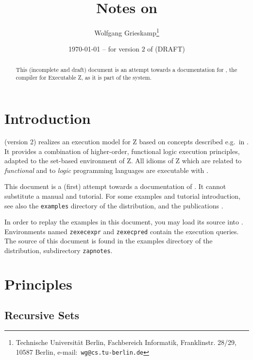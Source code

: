 \documentclass{article}
\begin{document}
\title{Notes on \ZAP}

\author{Wolfgang Grieskamp\thanks{Technische Universit\"at Berlin,
    Fachbereich Informatik, Franklinstr. 28/29, 10587 Berlin,
    e-mail:~\texttt{wg@cs.tu-berlin.de}}}

\date{\today{} -- for version $2$ of \ZAP{} (DRAFT)}

\maketitle

\begin{abstract}
  This (incomplete and draft) document is an attempt towards a
  documentation for \ZAP, the compiler for
  Executable Z, as it is part of the \Zeta{} system. 
\end{abstract}

\tableofcontents

\section{Introduction}

\ZAP{} (version 2) realizes an execution model for Z based on concepts
described e.g.~in \cite{gri99b,gri00a}. It provides a
combination of higher-order, functional logic execution principles,
adapted to the set-based environment of Z. All idioms of Z which are
related to \emph{functional} and to \emph{logic} programming languages
are executable with \ZAP.

This document is a (first) attempt towards a documentation of \ZAP.
It cannot substitute a manual and tutorial.  For some examples and
tutorial introduction, see also the \verb:examples: directory of the
\Zeta{} distribution, and the publications \cite{gl00a,gl00b}.

\begin{remark}
  In order to replay the examples in this document, you may load its
  source into . Environments named
  \verb:zexecexpr: and \verb:zexecpred: contain the execution queries.
  The source of this document is found in the examples directory of
  the \Zeta{} distribution, subdirectory \verb:zapnotes:.
\end{remark}

\section{Principles}


\subsection{Recursive Sets}
\end{document}
